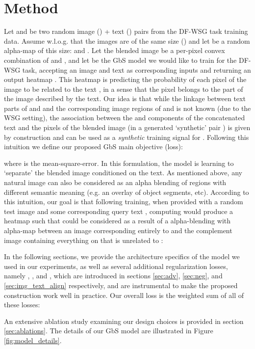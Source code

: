 \documentclass[10pt,twocolumn,letterpaper]{article}
\def\oursspace{{GbS }}
\def\ourstaskspace{DF-WSG }
\newcommand\secvspace{\vspace{-0.0cm}}
\begin{document}
\section{Method}\label{sec:method}
\secvspace
Let  and  be two random image () + text () pairs from the \ourstaskspace task training data.
Assume w.l.o.g. that the images are of the same size () and let  be a random alpha-map of this size:  and .
Let the blended image  be a per-pixel convex combination of  and , and let  be the \oursspace model we would like to train for the \ourstaskspace task, accepting an image  and text  as corresponding inputs and returning an output heatmap . This heatmap  is predicting the probability of each pixel of the image  to be related to the text , in a sense that the pixel belongs to the part of the image described by the text. Our idea is that while the linkage between text parts of  and  and the corresponding image regions of  and  is not known (due to the WSG setting), the association between the  and  components of the concatenated text  
and the pixels of the blended image  (in a generated `synthetic' pair ) is given by construction 
and can be used as a \textit{synthetic} training signal for . Following this intuition we define our proposed \oursspace main objective (loss):

where  is the mean-square-error. In this formulation, the model  is learning to `separate' the blended image  conditioned on the text. As mentioned above, any natural image can also be considered as an alpha blending of regions with different semantic meaning (e.g. an overlay of object segments, etc). According to this intuition, our goal is that following training, when provided with a random test image  and some corresponding query text , computing  would produce a heatmap  such that  could be considered as a result of a alpha-blending 
with  alpha-map between an image  corresponding entirely to  and the complement image  containing everything on  that is unrelated to :


In the following sections, we provide the architecture specifics of the model we used in our experiments, as well as several additional regularization losses, namely , , and , which are introduced in sections \ref{sec:adv}, \ref{sec:neg}, and \ref{sec:img_text_align} respectively, and are instrumental to make the proposed construction work well in practice. 
Our overall loss  is the weighted sum of all of these losses:

An extensive ablation study examining our design choices is provided in section \ref{sec:ablations}. The details of our \oursspace model are illustrated in Figure \ref{fig:model_details}.
\end{document}
